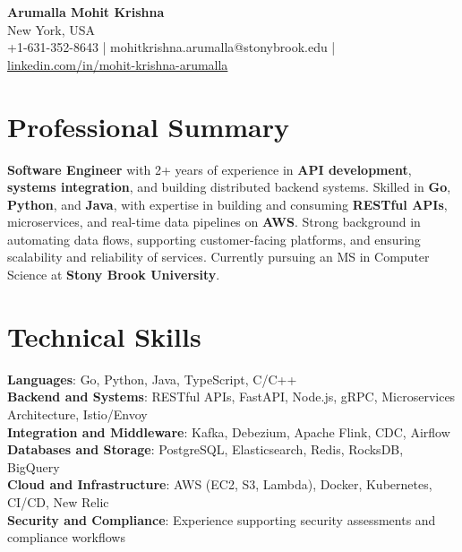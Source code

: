 \documentclass[letterpaper,11pt]{article}
\begin{document}
\begin{center}
  {\Large \textbf{Arumalla Mohit Krishna}} \\
  New York, USA \\
  +1-631-352-8643 \enspace | \enspace mohitkrishna.arumalla@stonybrook.edu \enspace | \enspace \href{https://www.linkedin.com/in/mohit-krishna-arumalla}{linkedin.com/in/mohit-krishna-arumalla}
\end{center}

\section{Professional Summary}
  \begin{itemize}[leftmargin=0.15in, label={}]
    \small{\item{
     \textbf{Software Engineer} with 2+ years of experience in \textbf{API development}, \textbf{systems integration}, and building distributed backend systems. Skilled in \textbf{Go}, \textbf{Python}, and \textbf{Java}, with expertise in building and consuming \textbf{RESTful APIs}, microservices, and real-time data pipelines on \textbf{AWS}. Strong background in automating data flows, supporting customer-facing platforms, and ensuring scalability and reliability of services. Currently pursuing an MS in Computer Science at \textbf{Stony Brook University}.
    }}
  \end{itemize}
\vspace{-16pt}

\section{Technical Skills}
 \begin{itemize}[leftmargin=0.15in, label={}]
    \small{\item{
     \textbf{Languages}: Go, Python, Java, TypeScript, C/C++ \\
     \textbf{Backend and Systems}: RESTful APIs, FastAPI, Node.js, gRPC, Microservices Architecture, Istio/Envoy \\
     \textbf{Integration and Middleware}: Kafka, Debezium, Apache Flink, CDC, Airflow \\
     \textbf{Databases and Storage}: PostgreSQL, Elasticsearch, Redis, RocksDB, BigQuery \\
     \textbf{Cloud and Infrastructure}: AWS (EC2, S3, Lambda), Docker, Kubernetes, CI/CD, New Relic \\
     \textbf{Security and Compliance}: Experience supporting security assessments and compliance workflows
    }}
 \end{itemize}
\vspace{-16pt}
\end{document}
